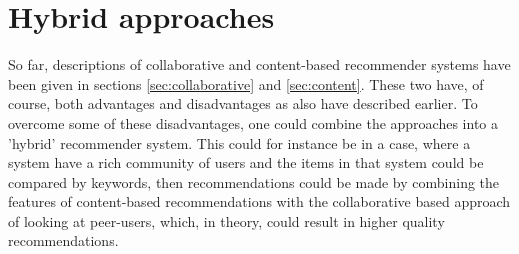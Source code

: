 \newpage
\section{Hybrid approaches}
So far, descriptions of collaborative and content-based recommender systems have been given in sections \ref{sec:collaborative} and \ref{sec:content}. These two have, of course, both advantages and disadvantages as also have described earlier. To overcome some of these disadvantages, one could combine the approaches into a 'hybrid' recommender system. This could for instance be in a case, where a system have a rich community of users and the items in that system could be compared by keywords, then recommendations could be made by combining the features of content-based recommendations with the collaborative based approach of looking at peer-users, which, in theory, could result in higher quality recommendations.\newline


